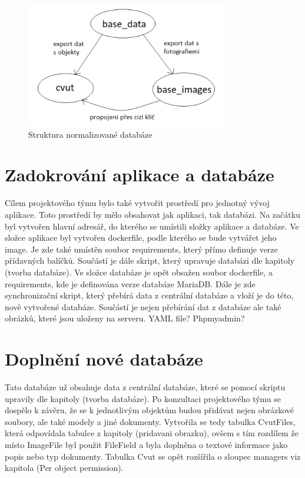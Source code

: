 \begin{figure}[H] \centering
    \includegraphics[width=250pt]{./pictures/18-db-diagram.PNG}
    \caption[Struktura normalizované databáze]{Struktura normalizované databáze}
	\label{fig:Struktura noramlizované databáze}              
\end{figure}


\section{Zadokrování aplikace a databáze}

Cílem projektového týmu bylo také vytvořit prostředí pro jednotný vývoj aplikace. Toto prostředí by mělo obsahovat jak aplikaci, tak databázi. Na začátku byl vytvořen hlavní adresář, do kterého se umístili složky aplikace a databáze. Ve složce aplikace byl vytvořen dockerfile, podle kterého se bude vytvářet jeho image. Je zde také umístěn soubor requirements, který přímo definuje verze přídavných balíčků. Součástí je dále skript, který upravuje databázi dle kapitoly (tvorba databáze). Ve složce databáze je opět obsažen soubor dockerfile, a requirements, kde je definována verze databáze MariaDB. Dále je zde synchronizační skript, který přebírá data z centrální databáze a vloží je do této, nově vytvořené databáze. Součástí je nejen přebírání dat z databáze ale také obrázků, které jsou uloženy na serveru. YAML file? Phpmyadmin?

\newpage

\section{Doplnění nové databáze}

Tato databáze už obsahuje data z centrální databáze, které se pomocí skriptu upravily dle kapitoly (tvorba databáze). Po konzultaci projektového týmu se dospělo k závěru, že se k jednotlivým objektům budou přidávat nejen obrázkové soubory, ale také modely a jiné dokumenty. Vytvořila se tedy tabulka CvutFiles, která odpovídala tabulce z kapitoly (pridavani obrazku), ovšem s tím rozdílem že místo ImageFile byl použit FileField a byla doplněna o textové informace jako popis nebo typ dokumenty. Tabulka Cvut se opět rozšířila o sloupec managers viz kapitola (Per object permission).

